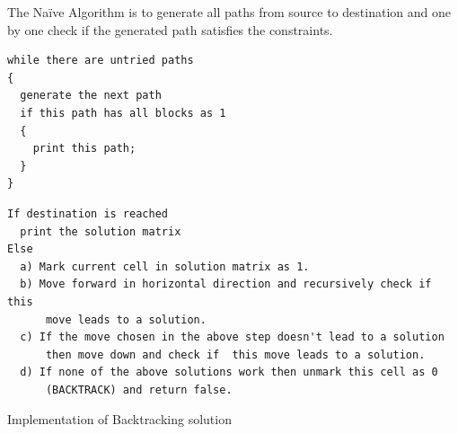 \RayNotesEnd

\textbf{}


The Na\"ive Algorithm is to generate all paths from source to destination
and one by one check if the generated path satisfies the constraints.
\begin{lstlisting}[style=pseudostyle,numbers=none]
while there are untried paths
{
  generate the next path
  if this path has all blocks as 1
  {
    print this path;
  }
}
\end{lstlisting}


\begin{lstlisting}[style=pseudostyle,numbers=none]
If destination is reached
  print the solution matrix
Else
  a) Mark current cell in solution matrix as 1. 
  b) Move forward in horizontal direction and recursively check if this 
      move leads to a solution. 
  c) If the move chosen in the above step doesn't lead to a solution
      then move down and check if  this move leads to a solution. 
  d) If none of the above solutions work then unmark this cell as 0 
      (BACKTRACK) and return false.
\end{lstlisting}
Implementation of Backtracking solution
